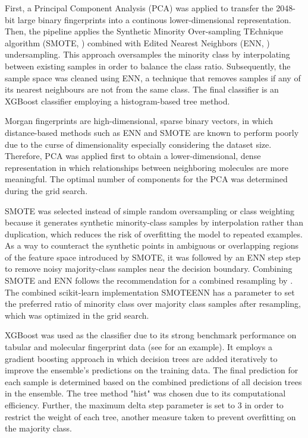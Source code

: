 \documentclass[hidelinks,11pt]{article}
\begin{document}
First, a Principal Component Analysis (PCA) was applied to transfer the 2048-bit large binary fingerprints 
into a continous lower-dimensional representation.
Then, the pipeline applies the Synthetic Minority Over-sampling TEchnique algorithm (SMOTE, \cite{chawlaSMOTESyntheticMinority2002}) combined with
Edited Nearest Neighbors (ENN, \cite{wilsonAsymptoticPropertiesNearest1972}) undersampling.
This approach oversamples the minority class by interpolating between existing samples
in order to balance the class ratio.
Subsequently, the sample space was cleaned using ENN, a technique that removes samples if any of its nearest neighbours are 
not from the same class.
The final classifier is an XGBoost \parencite{chenXGBoostScalableTree2016} classifier employing a histogram-based tree method.

Morgan fingerprints are high-dimensional, sparse binary vectors, in which distance-based methods such 
as ENN and SMOTE are known to perform poorly 
due to the curse of dimensionality \parencite{altmanCursesDimensionality2018} especially considering the dataset size.
Therefore, PCA was applied first to obtain a lower-dimensional,
dense representation in which relationships between neighboring molecules are more meaningful.
The optimal number of components for the PCA was determined during the grid search.

SMOTE was selected instead of simple random oversampling or 
class weighting because it generates synthetic minority-class
samples by interpolation rather than duplication, which reduces the risk of overfitting the model to 
repeated examples.
As a way to counteract the synthetic points in ambiguous or overlapping regions of the feature space 
introduced by SMOTE, it was followed by an ENN step 
step to remove noisy majority-class samples near the decision boundary. 
Combining SMOTE and ENN follows the recommendation for a combined resampling by 
\cite{batistaBalancingStrategiesClass2005}.
The combined scikit-learn implementation SMOTEENN \parencite{lemaitreImbalancedlearnPythonToolbox2016} has a parameter 
to set the preferred ratio of minority class over majority class samples after resampling, which 
was optimized in the grid search.

XGBoost was used as the classifier due to its strong 
benchmark performance on tabular and molecular fingerprint data (see \cite{dingMolecularFingerprintbasedMachine2021}
for an example).
It employs a gradient boosting approach in which decision trees are added iteratively to improve
the ensemble's predictions on the training data.
The final prediction for each sample is determined based on the combined predictions of all decision trees in the ensemble.
The tree method "hist" was chosen due to its computational efficiency. 
Further, the maximum delta step parameter is set to 3 in order to restrict the weight of each tree, 
another measure taken to prevent overfitting on the majority class.
\end{document}
